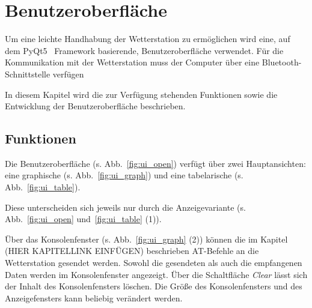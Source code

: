 \section{Benutzeroberfläche}\label{sec:benutzeroberflaeche}
Um eine leichte Handhabung der Wetterstation zu ermöglichen wird eine, auf dem PyQt5~\cite{pyqt5} Framework basierende, Benutzeroberfläche verwendet. Für die Kommunikation mit der Wetterstation muss der Computer über eine Bluetooth-Schnittstelle verfügen

In diesem Kapitel wird die zur Verfügung stehenden Funktionen sowie die Entwicklung der Benutzeroberfläche beschrieben.

\subsection{Funktionen}\label{sec:bo_funktionen}
Die Benutzeroberfläche (s. Abb.~\ref{fig:ui_open}) verfügt über zwei Hauptansichten: eine graphische (s. Abb.~\ref{fig:ui_graph}) und eine tabelarische (s. Abb.~\ref{fig:ui_table}).

Diese unterscheiden sich jeweils nur durch die Anzeigevariante (s. Abb.~\ref{fig:ui_open} und~\ref{fig:ui_table} (1)).

Über das Konsolenfenster (s. Abb.~\ref{fig:ui_graph} (2)) können die im Kapitel (HIER KAPITELLINK EINFÜGEN) beschrieben AT-Befehle an die Wetterstation gesendet werden. Sowohl die gesendeten als auch die empfangenen Daten werden im Konsolenfenster angezeigt. Über die Schaltfläche \emph{Clear} lässt sich der Inhalt des Konsolenfensters löschen. Die Größe des Konsolenfensters und des Anzeigefensters kann beliebig verändert werden.


